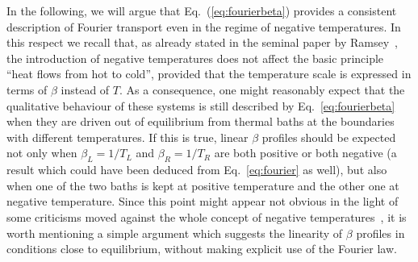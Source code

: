 \documentclass[iop, twocolumns, amssymb,notitlepage]{revtex4-1}
\begin{document}
In the following, we will argue that Eq.~(\ref{eq:fourierbeta}) provides a consistent description of Fourier transport
even in the regime of negative temperatures. In this respect we recall that,
as already stated in 
the seminal paper by Ramsey~\cite{ramsey56}, the introduction of negative temperatures does 
not affect the basic principle ``heat flows from hot to cold'', provided that 
the temperature scale is expressed in terms of $\beta$ instead of $T$. As a 
consequence, one might reasonably expect that the qualitative behaviour of these 
systems is still described by Eq.~\eqref{eq:fourierbeta} when they are driven 
out of equilibrium from thermal baths  at the boundaries with different 
temperatures. If this is true, linear $\beta$ profiles should be expected not 
only when $\beta_L=1/T_L$ and $\beta_R=1/T_R$ are both positive or both negative 
(a result which could have been deduced from Eq.~\eqref{eq:fourier} as well), 
but also when one of the two baths is kept at positive temperature and the other one at 
negative temperature. Since this point might appear not obvious in the light of some criticisms
moved against the whole concept of negative temperatures~\cite{romero13, dunkel14},
it is worth mentioning a simple argument which suggests the linearity of $\beta$ profiles
in conditions close to equilibrium, without making explicit use of the Fourier law.
\end{document}
